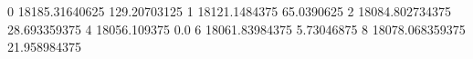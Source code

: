 0 18185.31640625 129.20703125
1 18121.1484375 65.0390625
2 18084.802734375 28.693359375
4 18056.109375 0.0
6 18061.83984375 5.73046875
8 18078.068359375 21.958984375
